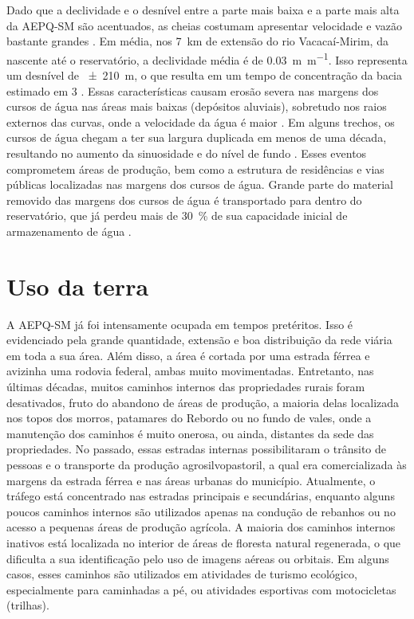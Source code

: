 Dado que a declividade e o desnível entre a parte mais baixa e a parte mais alta da AEPQ-SM são 
acentuados, as cheias costumam apresentar velocidade e vazão bastante grandes \citep{PaivaEtAl2001, 
SutiliEtAl2009}. Em média, nos \SI{7}{\kilo\metre} de extensão do rio Vacacaí-Mirim, da nascente até
o reservatório, a declividade média é de \SI{0,03}{\metre\per\metre}. Isso representa um desnível de
\SI{\pm210}{\metre}, o que resulta em um tempo de concentração da bacia estimado em \SI{3}{\hours} 
\citep{PaivaEtAl2001}. Essas características causam erosão severa nas margens dos cursos de água nas
áreas mais baixas (depósitos aluviais), sobretudo nos raios externos das curvas, onde a velocidade 
da água é maior \citep{SutiliEtAl2009}. Em alguns trechos, os cursos de água chegam a ter sua 
largura duplicada em menos de uma década, resultando no aumento da sinuosidade e do nível de fundo 
\citep{PaivaEtAl2001}. Esses eventos comprometem áreas de produção, bem como a estrutura de 
residências e vias públicas localizadas nas margens dos cursos de água. Grande parte do material 
removido das margens dos cursos de água é transportado para dentro do reservatório, que já perdeu 
mais de \SI{30}{\percent} de sua capacidade inicial de armazenamento de água \citep{DillEtAl2004}.

\section{Uso da terra}

A AEPQ-SM já foi intensamente ocupada em tempos pretéritos. Isso é evidenciado pela grande 
quantidade, extensão e boa distribuição da rede viária em toda a sua área. Além disso, a área é 
cortada por uma estrada férrea e avizinha uma rodovia federal, ambas muito movimentadas. Entretanto,
nas últimas décadas, muitos caminhos internos das propriedades rurais foram desativados, fruto do 
abandono de áreas de produção, a maioria delas localizada nos topos dos morros, patamares do Rebordo
ou no fundo de vales, onde a manutenção dos caminhos é muito onerosa, ou ainda, distantes da sede 
das propriedades. No passado, essas estradas internas possibilitaram o trânsito de pessoas e o 
transporte da produção agrosilvopastoril, a qual era comercializada às margens da estrada férrea e 
nas áreas urbanas do município. Atualmente, o tráfego está concentrado nas estradas principais e 
secundárias, enquanto alguns poucos caminhos internos são utilizados apenas na condução de rebanhos 
ou no acesso a pequenas áreas de produção agrícola. A maioria dos caminhos internos inativos está 
localizada no interior de áreas de floresta natural regenerada, o que dificulta a sua identificação 
pelo uso de imagens aéreas ou orbitais. Em alguns casos, esses caminhos são utilizados em atividades
de turismo ecológico, especialmente para caminhadas a pé, ou atividades esportivas com motocicletas
(trilhas).

